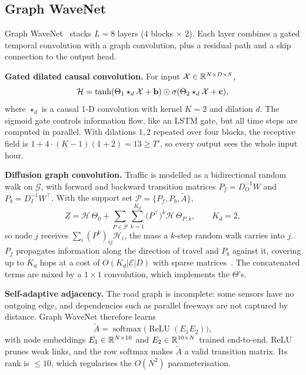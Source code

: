 \subsection{Graph WaveNet}
Graph WaveNet~\cite{wu2019gwnet} stacks $L=8$ layers (4 blocks $\times$ 2). Each
layer combines a gated temporal convolution with a graph convolution, plus a residual
path and a skip connection to the output head.

\textbf{Gated dilated causal convolution.} For input
$\mathcal{X}\in\mathbb{R}^{N\times D\times S}$,
\begin{equation}
\mathcal{H}=\tanh(\Theta_1\star_d\mathcal{X}+\mathbf{b})\odot\sigma(\Theta_2\star_d\mathcal{X}+\mathbf{c}),
\end{equation}
where $\star_d$ is a causal 1-D convolution with kernel $K{=}2$ and dilation $d$. The
sigmoid gate controls information flow, like an LSTM gate, but all time steps are
computed in parallel. With dilations $1,2$ repeated over four blocks, the receptive
field is $1+4\cdot(K{-}1)(1+2)=13\ge T'$, so every output sees the whole input hour.

\textbf{Diffusion graph convolution.} Traffic is modelled as a bidirectional random
walk on $\mathcal{G}$, with forward and backward transition matrices
$P_f=D_O^{-1}W$ and $P_b=D_I^{-1}W^{\top}$. With the support set
$\mathcal{P}=\{P_f,P_b,\tilde{A}\}$,
\begin{equation}
Z=\mathcal{H}\,\Theta_0+\sum_{P\in\mathcal{P}}\sum_{k=1}^{K_d}\big(P^{\top}\big)^{k}\mathcal{H}\,\Theta_{P,k},\qquad K_d=2,
\label{eq:diffusion}
\end{equation}
so node $j$ receives $\sum_i (P^k)_{ij}\mathcal{H}_i$, the mass a $k$-step random
walk carries into $j$. $P_f$ propagates information along the direction of travel
and $P_b$ against it, covering up to $K_d$ hops at a cost of $O(K_d|\mathcal{E}|D)$
with sparse matrices~\cite{li2018dcrnn}. The concatenated terms are mixed by a
$1{\times}1$ convolution, which implements the $\Theta$'s.

\textbf{Self-adaptive adjacency.} The road graph is incomplete: some sensors have no
outgoing edge, and dependencies such as parallel freeways are not captured by
distance. Graph WaveNet therefore learns
\begin{equation}
\tilde{A}=\operatorname{softmax}\!\big(\operatorname{ReLU}(E_1E_2)\big),
\end{equation}
with node embeddings $E_1\in\mathbb{R}^{N\times 10}$ and $E_2\in\mathbb{R}^{10\times N}$ trained end-to-end. ReLU prunes weak links, and the row softmax makes $\tilde{A}$ a valid
transition matrix. Its rank is $\le 10$, which regularises the $O(N^2)$ parameterisation.

